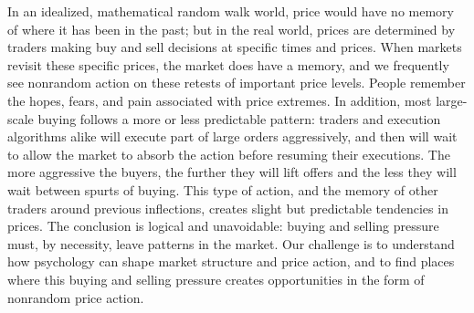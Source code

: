 \documentclass[10pt,twocolumn]{../notes}
\begin{document}
\Quote In an idealized, mathematical random walk world, price would have no memory of where it has been in the past; but in the real world, prices are determined by traders making buy and sell decisions at specific times and prices. When markets revisit these specific prices, the market does have a memory, and we frequently see nonrandom action on these retests of important price levels. People remember the hopes, fears, and pain associated with price extremes.
\Quote In addition, most large-scale buying follows a more or less predictable pattern: traders and execution algorithms alike will execute part of large orders aggressively, and then will wait to allow the market to absorb the action before resuming their executions. The more aggressive the buyers, the further they will lift offers and the less they will wait between spurts of buying. This type of action, and the memory of other traders around previous inflections, creates slight but predictable tendencies in prices.
\Quote The conclusion is logical and unavoidable: buying and selling pressure must, by necessity, leave patterns in the market. Our challenge is to understand how psychology can shape market structure and price action, and to find places where this buying and selling pressure creates opportunities in the form of nonrandom price action.
\end{document}
